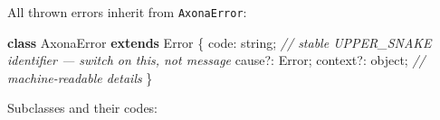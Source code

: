 \documentclass[
  nobib]{tufte-handout}
\newenvironment{Shaded}{}{}
\newcommand{\BuiltInTok}[1]{\textcolor[rgb]{0.00,0.50,0.00}{#1}}
\newcommand{\CommentTok}[1]{\textcolor[rgb]{0.38,0.63,0.69}{\textit{#1}}}
\newcommand{\DataTypeTok}[1]{\textcolor[rgb]{0.56,0.13,0.00}{#1}}
\newcommand{\KeywordTok}[1]{\textcolor[rgb]{0.00,0.44,0.13}{\textbf{#1}}}
\newcommand{\NormalTok}[1]{#1}
\newcommand{\OperatorTok}[1]{\textcolor[rgb]{0.40,0.40,0.40}{#1}}
\begin{document}
All thrown errors inherit from \texttt{AxonaError}:

\begin{Shaded}
\begin{Highlighting}[]
\KeywordTok{class}\NormalTok{ AxonaError }\KeywordTok{extends} \BuiltInTok{Error}\NormalTok{ \{}
  \DataTypeTok{code}\OperatorTok{:}\NormalTok{     string}\OperatorTok{;}   \CommentTok{// stable UPPER\_SNAKE identifier — switch on this, not message}
\NormalTok{  cause}\OperatorTok{?:}   \BuiltInTok{Error}\OperatorTok{;}
\NormalTok{  context}\OperatorTok{?:}\NormalTok{ object}\OperatorTok{;}   \CommentTok{// machine{-}readable details}
\NormalTok{\}}
\end{Highlighting}
\end{Shaded}

Subclasses and their codes:
\end{document}
